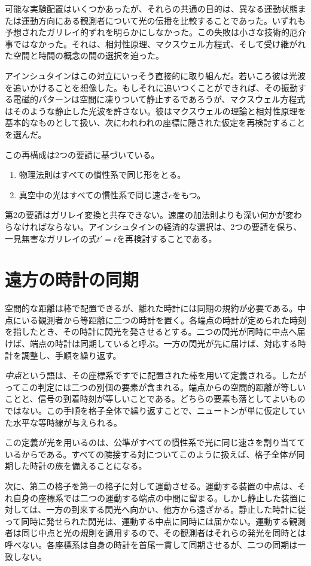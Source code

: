 可能な実験配置はいくつかあったが、それらの共通の目的は、異なる運動状態または運動方向にある観測者について光の伝播を比較することであった。いずれも予想されたガリレイ的ずれを明らかにしなかった。この失敗は小さな技術的厄介事ではなかった。それは、相対性原理、マクスウェル方程式、そして受け継がれた空間と時間の概念の間の選択を迫った。

アインシュタインはこの対立にいっそう直接的に取り組んだ。若いころ彼は光波を追いかけることを想像した。もしそれに追いつくことができれば、その振動する電磁的パターンは空間に凍りついて静止するであろうが、マクスウェル方程式はそのような静止した光波を許さない。彼はマクスウェルの理論と相対性原理を基本的なものとして扱い、次にわれわれの座標に隠された仮定を再検討することを選んだ。

この再構成は2つの要請に基づいている。
\begin{enumerate}
\item 物理法則はすべての慣性系で同じ形をとる。
\item 真空中の光はすべての慣性系で同じ速さ\(c\)をもつ。
\end{enumerate}

第2の要請はガリレイ変換と共存できない。速度の加法則よりも深い何かが変わらなければならない。アインシュタインの経済的な選択は、2つの要請を保ち、一見無害なガリレイの式\(t'=t\)を再検討することである。

\section{遠方の時計の同期}

空間的な距離は棒で配置できるが、離れた時計には同期の規約が必要である。中点にいる観測者から等距離に二つの時計を置く。各端点の時計が定められた時刻を指したとき、その時計に閃光を発させるとする。二つの閃光が同時に中点へ届けば、端点の時計は同期していると呼ぶ。一方の閃光が先に届けば、対応する時計を調整し、手順を繰り返す。

\emph{中点}という語は、その座標系ですでに配置された棒を用いて定義される。したがってこの判定には二つの別個の要素が含まれる。端点からの空間的距離が等しいことと、信号の到着時刻が等しいことである。どちらの要素も落としてよいものではない。この手順を格子全体で繰り返すことで、ニュートンが単に仮定していた水平な等時線が与えられる。

この定義が光を用いるのは、公準がすべての慣性系で光に同じ速さを割り当てているからである。すべての隣接する対についてこのように扱えば、格子全体が同期した時計の族を備えることになる。

次に、第二の格子を第一の格子に対して運動させる。運動する装置の中点は、それ自身の座標系では二つの運動する端点の中間に留まる。しかし静止した装置に対しては、一方の到来する閃光へ向かい、他方から遠ざかる。静止した時計に従って同時に発せられた閃光は、運動する中点に同時には届かない。運動する観測者は同じ中点と光の規則を適用するので、その観測者はそれらの発光を同時とは呼べない。各座標系は自身の時計を首尾一貫して同期させるが、二つの同期は一致しない。

